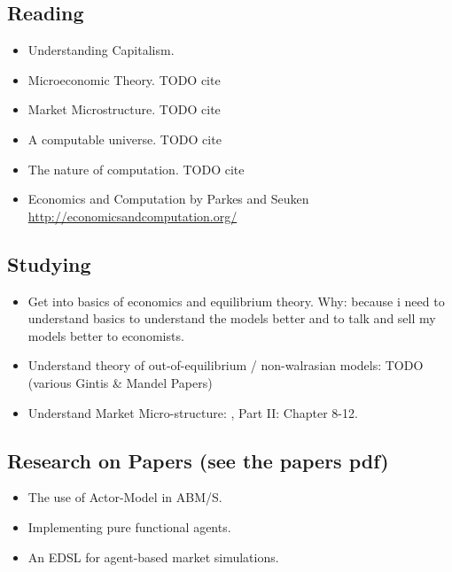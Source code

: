 \documentclass{article}
\begin{document}
\subsection{Reading}
\begin{itemize}
\item Understanding Capitalism. \cite{bowles_understanding_2005}
\item Microeconomic Theory. TODO cite
\item Market Microstructure. TODO cite
\item A computable universe. TODO cite
\item The nature of computation. TODO cite
\item Economics and Computation by Parkes and Seuken \url{http://economicsandcomputation.org/}
\end{itemize}

\subsection{Studying}
\begin{itemize}
\item Get into basics of economics and equilibrium theory. Why: because i need to understand basics to understand the models better and to talk and sell my models better to economists.
\item Understand theory of out-of-equilibrium / non-walrasian models: TODO (various Gintis \& Mandel Papers)
\item Understand Market Micro-structure: \cite{LehalleLaruelle2013}, \cite{baker_market_2013} Part II: Chapter 8-12.
\end{itemize}

\subsection{Research on Papers (see the papers pdf)}
\begin{itemize}
\item The use of Actor-Model in ABM/S.
\item Implementing pure functional agents.
\item An EDSL for agent-based market simulations.
\end{itemize}





\end{document}
